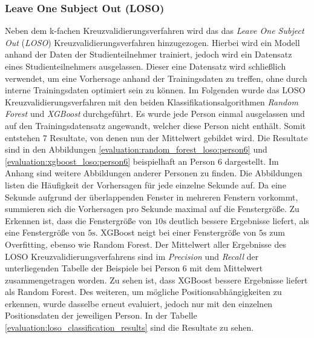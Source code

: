 \subsubsection{Leave One Subject Out (LOSO)}
Neben dem k-fachen Kreuzvalidierungsverfahren wird das das \textit{Leave One Subject Out} (\textit{LOSO}) Kreuzvalidierungsverfahren hinzugezogen. 
Hierbei wird ein Modell anhand der Daten der Studienteilnehmer trainiert, jedoch wird ein Datensatz eines Studienteilnehmers ausgelassen. 
Dieser eine Datensatz wird schließlich verwendet, um eine Vorhersage anhand der Trainingsdaten zu treffen, ohne durch interne Trainingsdaten optimiert sein zu können.
Im Folgenden wurde das LOSO Kreuzvalidierungsverfahren mit den beiden Klassifikationsalgorithmen \textit{Random Forest} und \textit{XGBoost} durchgeführt. 
Es wurde jede Person einmal ausgelassen und auf den Trainingsdatensatz angewandt, welcher diese Person nicht enthält. 
Somit entstehen 7 Resultate, von denen nun der Mittelwert gebildet wird.
Die Resultate sind in den Abbildungen \ref{evaluation:random_forest_loso:person6} und \ref{evaluation:xgboost_loso:person6} beispielhaft an Person 6 dargestellt.
Im Anhang sind weitere Abbildungen anderer Personen zu finden.
Die Abbildungen listen die Häufigkeit der Vorhersagen für jede einzelne Sekunde auf. 
Da eine Sekunde aufgrund der überlappenden Fenster in mehreren Fenstern vorkommt, summieren sich die Vorhersagen pro Sekunde maximal auf die Fenstergröße.
Zu Erkennen ist, dass die Fenstergröße von $10\si{\s}$ deutlich bessere Ergebnisse liefert, als eine Fenstergröße von $5\si{\s}$. 
XGBoost neigt bei einer Fenstergröße von $5\si{\s}$ zum Overfitting, ebenso wie Random Forest. 
Der Mittelwert aller Ergebnisse des LOSO Kreuzvalidierungsverfahrens sind im \textit{Precision} und \textit{Recall} der unterliegenden Tabelle der Beispiele bei Person 6 mit dem Mittelwert zusammengetragen worden. 
Zu sehen ist, dass XGBoost bessere Ergebnisse liefert als Random Forest.
Des weiteren, um mögliche Positionsabhängigkeiten zu erkennen, wurde dasselbe erneut evaluiert, jedoch nur mit den einzelnen Positionsdaten der jeweiligen Person. 
In der Tabelle \ref{evaluation:loso_classification_results} sind die Resultate zu sehen.

